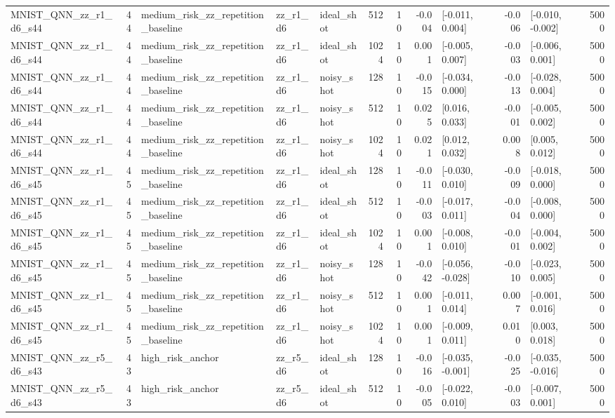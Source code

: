 \begin{table}[t]
\begin{tabular}{lrlllrrrlrlr}
MNIST\_QNN\_zz\_r1\_d6\_s44 & 44 & medium\_risk\_zz\_repetition\_baseline & zz\_r1\_d6 & ideal\_shot & 512 & 10 & -0.004 & [-0.011, 0.004] & -0.006 & [-0.010, -0.002] & 5000 \\
MNIST\_QNN\_zz\_r1\_d6\_s44 & 44 & medium\_risk\_zz\_repetition\_baseline & zz\_r1\_d6 & ideal\_shot & 1024 & 10 & 0.001 & [-0.005, 0.007] & -0.003 & [-0.006, 0.001] & 5000 \\
MNIST\_QNN\_zz\_r1\_d6\_s44 & 44 & medium\_risk\_zz\_repetition\_baseline & zz\_r1\_d6 & noisy\_shot & 128 & 10 & -0.015 & [-0.034, 0.000] & -0.013 & [-0.028, 0.004] & 5000 \\
MNIST\_QNN\_zz\_r1\_d6\_s44 & 44 & medium\_risk\_zz\_repetition\_baseline & zz\_r1\_d6 & noisy\_shot & 512 & 10 & 0.025 & [0.016, 0.033] & -0.001 & [-0.005, 0.002] & 5000 \\
MNIST\_QNN\_zz\_r1\_d6\_s44 & 44 & medium\_risk\_zz\_repetition\_baseline & zz\_r1\_d6 & noisy\_shot & 1024 & 10 & 0.021 & [0.012, 0.032] & 0.008 & [0.005, 0.012] & 5000 \\
MNIST\_QNN\_zz\_r1\_d6\_s45 & 45 & medium\_risk\_zz\_repetition\_baseline & zz\_r1\_d6 & ideal\_shot & 128 & 10 & -0.011 & [-0.030, 0.010] & -0.009 & [-0.018, 0.000] & 5000 \\
MNIST\_QNN\_zz\_r1\_d6\_s45 & 45 & medium\_risk\_zz\_repetition\_baseline & zz\_r1\_d6 & ideal\_shot & 512 & 10 & -0.003 & [-0.017, 0.011] & -0.004 & [-0.008, 0.000] & 5000 \\
MNIST\_QNN\_zz\_r1\_d6\_s45 & 45 & medium\_risk\_zz\_repetition\_baseline & zz\_r1\_d6 & ideal\_shot & 1024 & 10 & 0.001 & [-0.008, 0.010] & -0.001 & [-0.004, 0.002] & 5000 \\
MNIST\_QNN\_zz\_r1\_d6\_s45 & 45 & medium\_risk\_zz\_repetition\_baseline & zz\_r1\_d6 & noisy\_shot & 128 & 10 & -0.042 & [-0.056, -0.028] & -0.010 & [-0.023, 0.005] & 5000 \\
MNIST\_QNN\_zz\_r1\_d6\_s45 & 45 & medium\_risk\_zz\_repetition\_baseline & zz\_r1\_d6 & noisy\_shot & 512 & 10 & 0.001 & [-0.011, 0.014] & 0.007 & [-0.001, 0.016] & 5000 \\
MNIST\_QNN\_zz\_r1\_d6\_s45 & 45 & medium\_risk\_zz\_repetition\_baseline & zz\_r1\_d6 & noisy\_shot & 1024 & 10 & 0.001 & [-0.009, 0.011] & 0.010 & [0.003, 0.018] & 5000 \\
MNIST\_QNN\_zz\_r5\_d6\_s43 & 43 & high\_risk\_anchor & zz\_r5\_d6 & ideal\_shot & 128 & 10 & -0.016 & [-0.035, -0.001] & -0.025 & [-0.035, -0.016] & 5000 \\
MNIST\_QNN\_zz\_r5\_d6\_s43 & 43 & high\_risk\_anchor & zz\_r5\_d6 & ideal\_shot & 512 & 10 & -0.005 & [-0.022, 0.010] & -0.003 & [-0.007, 0.001] & 5000 \\

\end{tabular}
\end{table}
